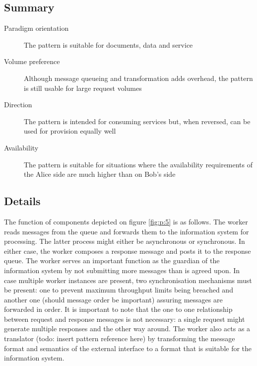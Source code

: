 \documentclass[10pt,a4paper]{article}
\begin{document}
\subsection{Summary}
\begin{description}
	\item[Paradigm orientation] The pattern is suitable for documents, data and service
	\item[Volume preference] Although message queueing and transformation adds overhead, the pattern is still usable for large request volumes
	\item[Direction] The pattern is intended for consuming services but, when reversed, can be used for provision equally well
	\item[Availability] The pattern is suitable for situations where the availability requirements of the Alice side are much higher than on Bob's side
\end{description}

\subsection{Details}
The function of components depicted on figure \ref{fig:p:5} is as follows.
The worker reads messages from the queue and forwards them to the information system for processing. The latter process might either be asynchronous or synchronous. In either case, the worker composes a response message and posts it to the response queue. The worker serves an important function as the guardian of the information system by not submitting more messages than is agreed upon. In case multiple worker instances are present, two synchronisation mechanisms must be present: one to prevent maximum throughput limits being breached and another one (should message order be important) assuring messages are forwarded in order. It is important to note that the one to one relationship between request and response messages is not necessary: a single request might generate multiple responses and the other way around. The worker also acts as a translator (todo: insert pattern reference here) by transforming the message format and semantics of the external interface to a format that is suitable for the information system. 
\end{document}
